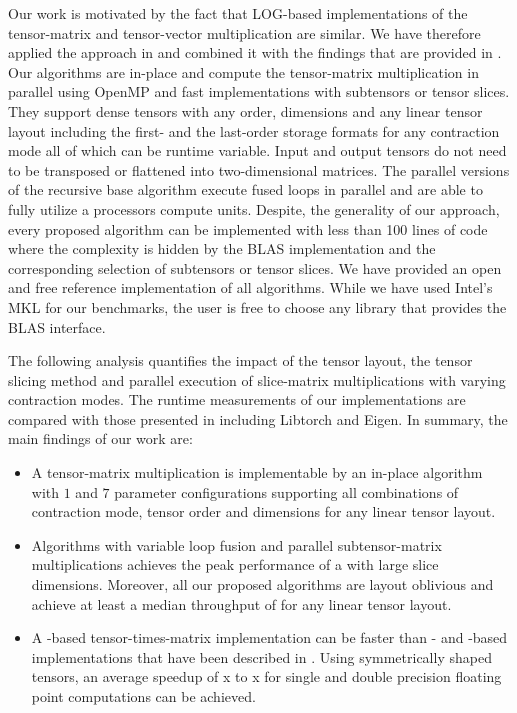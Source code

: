 Our work is motivated by the fact that LOG-based implementations of the tensor-matrix and tensor-vector multiplication are similar. 
We have therefore applied the approach in \cite{bassoy:2019:ttv} and combined it with the findings that are provided in \cite{li:2015:input}.
Our algorithms are in-place and compute the tensor-matrix multiplication in parallel using OpenMP and fast  implementations with subtensors or tensor slices.
They support dense tensors with any order, dimensions and any linear tensor layout including the first- and the last-order storage formats for any contraction mode all of which can be runtime variable.
Input and output tensors do not need to be transposed or flattened into two-dimensional matrices.
The parallel versions of the recursive base algorithm execute fused loops in parallel and are able to fully utilize a processors compute units.
Despite, the generality of our approach, every proposed algorithm can be implemented with less than 100 lines of  code where the complexity is hidden by the BLAS implementation and the corresponding selection of subtensors or tensor slices.
We have provided an open and free reference implementation of all algorithms.
While we have used Intel's MKL for our benchmarks, the user is free to choose any library that provides the BLAS interface.

The following analysis quantifies the impact of the tensor layout, the tensor slicing method and parallel execution of slice-matrix multiplications with varying contraction modes.
The runtime measurements of our implementations are compared with those presented in \cite{springer:2018:design, matthews:2018:high} including Libtorch and Eigen.
In summary, the main findings of our work are:
\begin{itemize}
	\item 
	A tensor-matrix multiplication is implementable by an in-place algorithm with $1$  and $7$  parameter configurations supporting all combinations of contraction mode, tensor order and dimensions for any linear tensor layout.
	\item 
	Algorithms with variable loop fusion and parallel subtensor-matrix multiplications achieves the peak performance of a  with large slice dimensions.
	Moreover, all our proposed algorithms are layout oblivious and achieve at least a median throughput of \tq for any linear tensor layout.
	\item
	A -based tensor-times-matrix implementation can be faster than - and -based implementations that have been described in \cite{springer:2018:design, matthews:2018:high}.
	Using symmetrically shaped tensors, an average speedup of \tq x to \tq x for single and double precision floating point computations can be achieved.
\end{itemize}

